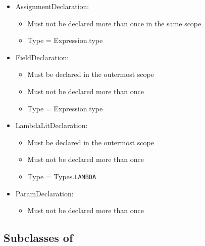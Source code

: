 \begin{itemize}
	\item AssignmentDeclaration:
		\begin{itemize}
			\item Must not be declared more than once in the same scope
			\item Type = Expression.type
		\end{itemize}
	\item FieldDeclaration:
		\begin{itemize}
			\item Must be declared in the outermost scope
			\item Must not be declared more than once
			\item Type = Expression.type
		\end{itemize}
	\item LambdaLitDeclaration:
		\begin{itemize}
			\item Must be declared in the outermost scope
			\item Must not be declared more than once
			\item Type = Types.\texttt{LAMBDA}
		\end{itemize}
	\item ParamDeclaration:
		\begin{itemize}
			\item Must not be declared more than once
		\end{itemize}
\end{itemize}

\subsection{Subclasses of }

